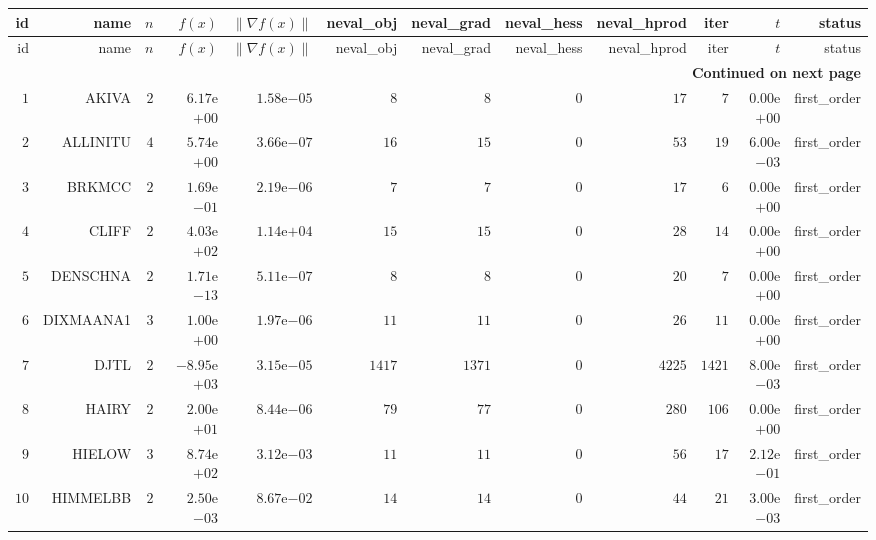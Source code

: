 \begin{longtable}{rrrrrrrrrrrr}
  \hline
  id & name & \(n\) & \(f(x)\) & \(\|\nabla f(x)\|\) & neval\_obj & neval\_grad & neval\_hess & neval\_hprod & iter & \(t\) & status \\\hline
  \endfirsthead
  \hline
  id & name & \(n\) & \(f(x)\) & \(\|\nabla f(x)\|\) & neval\_obj & neval\_grad & neval\_hess & neval\_hprod & iter & \(t\) & status \\\hline
  \endhead
  \hline
  \multicolumn{12}{r}{{\bfseries Continued on next page}}\\
  \hline
  \endfoot
  \endlastfoot
  \(     1\) & AKIVA & \(     2\) & \( 6.17\)e\(+00\) & \( 1.58\)e\(-05\) & \(     8\) & \(     8\) & \(     0\) & \(    17\) & \(     7\) & \( 0.00\)e\(+00\) & first\_order \\
  \(     2\) & ALLINITU & \(     4\) & \( 5.74\)e\(+00\) & \( 3.66\)e\(-07\) & \(    16\) & \(    15\) & \(     0\) & \(    53\) & \(    19\) & \( 6.00\)e\(-03\) & first\_order \\
  \(     3\) & BRKMCC & \(     2\) & \( 1.69\)e\(-01\) & \( 2.19\)e\(-06\) & \(     7\) & \(     7\) & \(     0\) & \(    17\) & \(     6\) & \( 0.00\)e\(+00\) & first\_order \\
  \(     4\) & CLIFF & \(     2\) & \( 4.03\)e\(+02\) & \( 1.14\)e\(+04\) & \(    15\) & \(    15\) & \(     0\) & \(    28\) & \(    14\) & \( 0.00\)e\(+00\) & first\_order \\
  \(     5\) & DENSCHNA & \(     2\) & \( 1.71\)e\(-13\) & \( 5.11\)e\(-07\) & \(     8\) & \(     8\) & \(     0\) & \(    20\) & \(     7\) & \( 0.00\)e\(+00\) & first\_order \\
  \(     6\) & DIXMAANA1 & \(     3\) & \( 1.00\)e\(+00\) & \( 1.97\)e\(-06\) & \(    11\) & \(    11\) & \(     0\) & \(    26\) & \(    11\) & \( 0.00\)e\(+00\) & first\_order \\
  \(     7\) & DJTL & \(     2\) & \(-8.95\)e\(+03\) & \( 3.15\)e\(-05\) & \(  1417\) & \(  1371\) & \(     0\) & \(  4225\) & \(  1421\) & \( 8.00\)e\(-03\) & first\_order \\
  \(     8\) & HAIRY & \(     2\) & \( 2.00\)e\(+01\) & \( 8.44\)e\(-06\) & \(    79\) & \(    77\) & \(     0\) & \(   280\) & \(   106\) & \( 0.00\)e\(+00\) & first\_order \\
  \(     9\) & HIELOW & \(     3\) & \( 8.74\)e\(+02\) & \( 3.12\)e\(-03\) & \(    11\) & \(    11\) & \(     0\) & \(    56\) & \(    17\) & \( 2.12\)e\(-01\) & first\_order \\
  \(    10\) & HIMMELBB & \(     2\) & \( 2.50\)e\(-03\) & \( 8.67\)e\(-02\) & \(    14\) & \(    14\) & \(     0\) & \(    44\) & \(    21\) & \( 3.00\)e\(-03\) & first\_order \\

\end{longtable}
